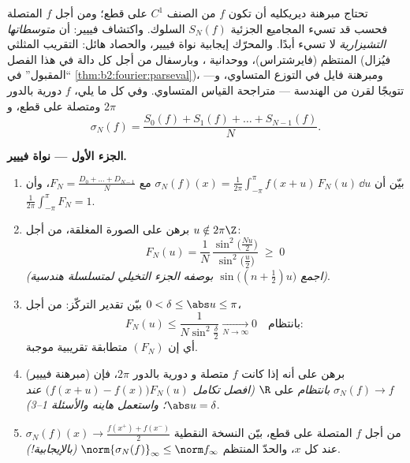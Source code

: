 \begin{problem}\label{pb:b2:fourier:1}
تحتاج مبرهنة ديريكليه أن تكون $f$ من الصنف $C^1$ على قطع؛ ومن أجل
$f$ المتصلة فحسب قد تسيء المجاميع الجزئية $S_N(f)$ السلوك. واكتشاف
فييير: أن \emph{متوسطاتها التشيزارية} لا تسيء أبدًا. والمحرّك
إيجابية نواة فييير، والحصاد
هائل: التقريب المثلثي المنتظم (فايرشتراس)،
ووحدانية ، وبارسفال من أجل كل دالة
في هذا الفصل (فيُزال ``المقبول'' في
\cref{thm:b2:fourier:parseval})، ومبرهنة فايل في التوزع
المتساوي، و--- تتويجًا لقرن من الهندسة ---
متراجحة القياس المتساوي.
وفي كل ما يلي، $f$ دورية بالدور $2\pi$ ومتصلة على قطع،
و
\[
\sigma_N(f) = \frac{S_0(f) + S_1(f) + \dots +
S_{N-1}(f)}{N} .
\]

\medskip
\noindent\textbf{الجزء الأول --- نواة فييير.}
\begin{enumerate}
  \item بيّن أن $\sigma_N(f)(x) =
        \frac{1}{2\pi}\int_{-\pi}^{\pi}f(x+u)\,F_N(u)\,\dd u$
        مع $F_N = \frac{D_0 + \dots + D_{N-1}}{N}$، وأن
        $\frac{1}{2\pi}\int_{-\pi}^{\pi}F_N = 1$.
  \item برهن على الصورة المغلقة، من أجل $u \notin 2\pi\Z$:
        \[
        F_N(u) = \frac{1}{N}\,
        \frac{\sin^2\bigl(\frac{Nu}{2}\bigr)}
        {\sin^2\bigl(\frac u2\bigr)} \;\geq\; 0
        \]
        \emph{(اجمع $\sin\bigl((n+\frac12)u\bigr)$ بوصفه
        الجزء التخيلي لمتسلسلة هندسية)}.
  \item بيّن تقدير التركّز: من أجل $0 < \delta \leq
        \abs u \leq \pi$،
        \[
        F_N(u) \leq \frac{1}{N\sin^2\frac\delta2}
        \xrightarrow[N\to\infty]{} 0
        \quad\text{بانتظام} :
        \]
        أي إن $(F_N)$ متطابقة تقريبية موجبة.
  \item (مبرهنة فييير) برهن على أنه إذا كانت $f$ متصلة و
        دورية بالدور $2\pi$، فإن $\sigma_N(f) \to f$
        \emph{بانتظام} على $\R$ \emph{(افصل تكامل
        $\bigl(f(x+u) - f(x)\bigr)F_N(u)$ عند $\abs u =
        \delta$؛ واستعمل هاينه والأسئلة 1--3)}.
  \item من أجل $f$ المتصلة على قطع، بيّن النسخة
        النقطية $\sigma_N(f)(x) \to \frac{f(x^+) +
        f(x^-)}{2}$ عند كل $x$، والحدّ المنتظم
        $\norm{\sigma_N(f)}_\infty \leq \norm f_\infty$
        \emph{(بالإيجابية!)}.
\end{enumerate}


\end{problem}
